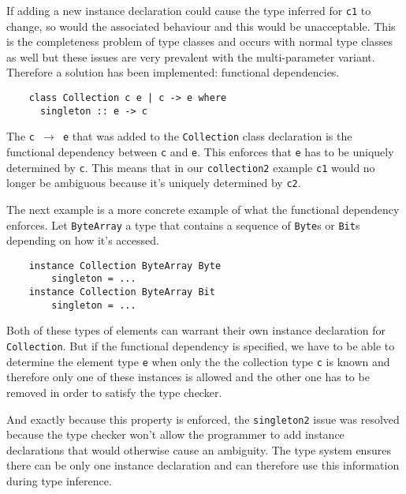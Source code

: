 If adding a new instance declaration could cause the type inferred for
\texttt{c1} to change, so would the associated behaviour and this would be
unacceptable. This is the completeness problem of type classes and occurs with
normal type classes as well but these issues are very prevalent with the
multi-parameter variant. Therefore a solution has been implemented: functional
dependencies.
\begin{verbatim}
    class Collection c e | c -> e where
      singleton :: e -> c
\end{verbatim}
The \texttt{c $\rightarrow$ e} that was added to the \texttt{Collection} class
declaration is the functional dependency between \texttt{c} and \texttt{e}. This
enforces that \texttt{e} has to be uniquely determined by \texttt{c}.
This means that in our \texttt{collection2} example \texttt{c1} would no longer
be ambiguous because it's uniquely determined by \texttt{c2}.

The next example is a more concrete example of what the functional dependency
enforces. Let \texttt{ByteArray} a type that contains a sequence of
\texttt{Byte}s or \texttt{Bit}s depending on how it's accessed.
\begin{verbatim}
    instance Collection ByteArray Byte
        singleton = ...
    instance Collection ByteArray Bit
        singleton = ...
\end{verbatim}
Both of these types of elements can warrant their own instance declaration for
\texttt{Collection}. But if the functional dependency is specified, we have to
be able to determine the element type \texttt{e} when only the the collection
type \texttt{c} is known and therefore only one of these instances is allowed
and the other one has to be removed in order to satisfy the type checker.

And exactly because this property is enforced, the \texttt{singleton2} issue was
resolved because the type checker won't allow the programmer to add instance
declarations that would otherwise cause an ambiguity. The type system ensures
there can be only one instance declaration and can therefore use this
information during type inference.

